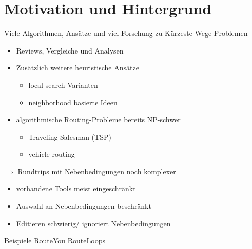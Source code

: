 \documentclass[aspectratio=169,xcolor=dvipsnames, t]{beamer}
\begin{document}
	
	\section{Motivation und Hintergrund}	
	\begin{frame}
		\vspace{0.5cm}
		Viele Algorithmen, Ansätze und viel  Forschung zu Kürzeste-Wege-Problemen
		\pause
		\begin{itemize}[<+->]
			\item Reviews, Vergleiche und Analysen \cite{madkourSurveyShortestPathAlgorithms2017, sommerShortestpathQueriesStatic2014, wayahdiGreedyAStarDijkstra2021}
			\item Zusätzlich weitere heuristische Ansätze
			\begin{itemize}[<+->]
				\item local search Varianten \cite{braysyVehicleRoutingProblem2005, irnichSequentialSearchIts2006, ropkeHeuristicExactAlgorithms2005}
				\item neighborhood basierte Ideen \cite{braysyVehicleRoutingProblem2005, irnichSequentialSearchIts2006, ropkeHeuristicExactAlgorithms2005}
			\end{itemize} 
		\item algorithmische Routing-Probleme  bereits NP-schwer \cite{reineltTravelingSalesmanComputational2003}
		\begin{itemize}[<+->]
			\item Traveling Salesman (TSP)\cite{gendreauHandbookMetaheuristics2010} 
			\item vehicle routing \cite{braysyVehicleRoutingProblem2005, irnichSequentialSearchIts2006}
		\end{itemize}
		\end{itemize}
		\pause
		
		$\Rightarrow$ Rundtrips mit Nebenbedingungen noch komplexer \cite{gemsaEfficientComputationJogging2013}
		\pause
		\begin{itemize}[<+->]
			\item vorhandene Tools meist eingeschränkt
			\item Auswahl an Nebenbedingungen beschränkt
			\item Editieren schwierig/ ignoriert Nebenbedingungen
		\end{itemize}
	\end{frame}
	
	\begin{frame}{Beispiele}
		\centering
		\vspace{2.5cm}
		\Huge
		\only<1> {\href{https://www.routeyou.com}{RouteYou}}
		\only<2> {\href{https://www.routeloops.com/}{RouteLoops}}
	\end{frame}
	
\end{document}
